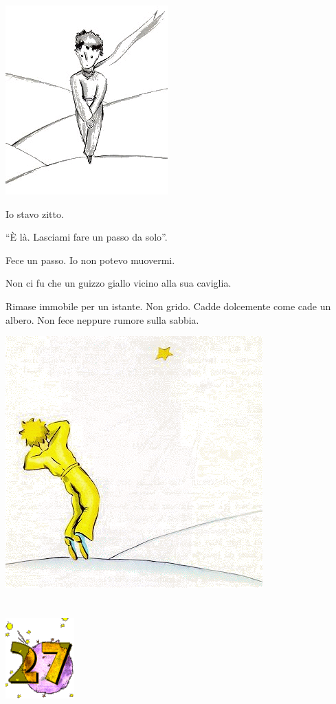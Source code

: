 \documentclass[11pt]{scrbook}
\begin{document}
\begin{center}
\includegraphics{./img/26c.png}
\end{center}

Io stavo zitto.

``È là. Lasciami fare un passo da solo''.

Fece un passo. Io non potevo muovermi.

Non ci fu che un guizzo giallo vicino alla sua caviglia.

Rimase immobile per un istante. Non grido. Cadde dolcemente come cade un
albero. Non fece neppure rumore sulla sabbia.

\begin{center}
\includegraphics{./img/zlaty.png}
\end{center}

\chapter{}
\begin{center}
\includegraphics{./img/chapter27.png}
\end{center}
\end{document}

